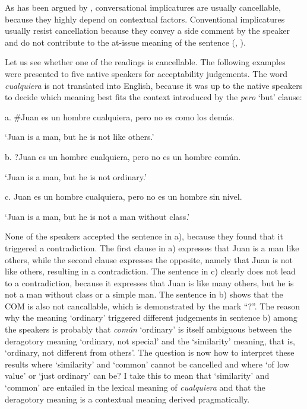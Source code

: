   As has been argued by \citet{Grice1989}, conversational implicatures are usually cancellable, because they highly depend on contextual factors. Conventional implicatures usually resist cancellation because they convey a side comment by the speaker and do not contribute to the at-issue meaning of the sentence (\citealt{Potts2005}, \citealt{SimonsEtAl2010}).

  Let us see whether one of the readings is cancellable. The following examples were presented to five native speakers for acceptability judgements. The word \textit{cualquiera} is not translated into English, because it was up to the native speakers to decide which meaning best fits the context introduced by the \textit{pero} ‘but’ clause:

\label{bkm:Ref42976554}  a.  \#Juan es un hombre cualquiera, pero no es como los demás.

    ‘Juan is a man, but he is not like others.’

  b.  ?Juan es un hombre cualquiera, pero no es un hombre común.

    ‘Juan is a man, but he is not ordinary.’

  c.  Juan es un hombre cualquiera, pero no es un hombre sin nivel.

    ‘Juan is a man, but he is not a man without class.’

None of the speakers accepted the sentence in a), because they found that it triggered a contradiction. The first clause in a) expresses that Juan is a man like others, while the second clause expresses the opposite, namely that Juan is not like others, resulting in a contradiction. The sentence in c) clearly does not lead to a contradiction, because it expresses that Juan is like many others, but he is not a man without class or a simple man. The sentence in b) shows that the COM is also not cancallable, which is demonstrated by the mark “?”. The reason why the meaning ‘ordinary’ triggered different judgements in sentence b) among the speakers is probably that \textit{común} ‘ordinary’ is itself ambiguous between the deragotory meaning ‘ordinary, not special’ and the ‘similarity’ meaning, that is, ‘ordinary, not different from others’. The question is now how to interpret these results where ‘similarity’ and ‘common’ cannot be cancelled and where ‘of low value’ or ‘just ordinary’ can be? I take this to mean that ‘similarity’ and ‘common’ are entailed in the lexical meaning of \textit{cualquiera} and that the deragotory meaning is a contextual meaning derived pragmatically.

